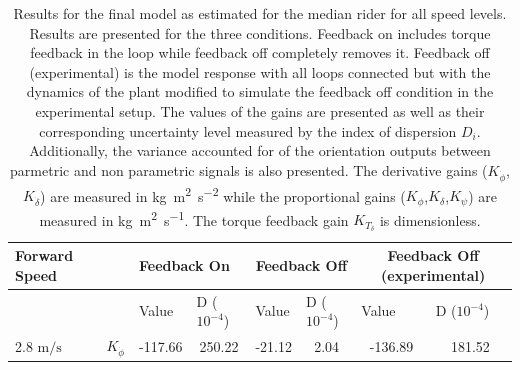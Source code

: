 \begin{table}[]
    \caption{ Results for the final  model as estimated for the median rider for all speed levels. Results are presented for the three conditions. Feedback on includes torque feedback in the loop while feedback off completely removes it. Feedback off (experimental) is the model response with all loops connected but with the dynamics of the plant modified to simulate the feedback off condition in the experimental setup. The values of the gains are presented as well as their corresponding uncertainty level measured by the index of dispersion \ensuremath{D_i}. Additionally, the variance accounted for of the orientation outputs between parmetric and non parametric signals is also presented. The derivative gains (\ensuremath{K_{\dot{\phi}}},\ensuremath{K_{\dot{\delta}}}) are measured in \si{\kilogram\square\meter\per\square\second} while the proportional gains (\ensuremath{K_{\phi}},\ensuremath{K_{\delta}},\ensuremath{K_{\psi}}) are measured in \si{\kilogram\square\meter\per\second}. The torque feedback gain \ensuremath{K_{T_\delta}} is dimensionless.}
    \begin{tabular}{llcccccc}
    \hline
    Forward Speed                &                       & \multicolumn{2}{l}{Feedback On}                                                                 & \multicolumn{2}{c}{Feedback Off}                                                                & \multicolumn{2}{c}{Feedback Off (experimental)}                                                 \\ \hline
                                    &                       & \multicolumn{1}{l}{\multirow{2}{*}{Value}} & \multicolumn{1}{l}{\multirow{2}{*}{D ($10^{-4}$)}} & \multicolumn{1}{l}{\multirow{2}{*}{Value}} & \multicolumn{1}{l}{\multirow{2}{*}{D ($10^{-4}$)}} & \multicolumn{1}{l}{\multirow{2}{*}{Value}} & \multicolumn{1}{l}{\multirow{2}{*}{D ($10^{-4}$)}} \\
                                    &                       & \multicolumn{1}{l}{}                       & \multicolumn{1}{l}{}                               & \multicolumn{1}{l}{}                       & \multicolumn{1}{l}{}                               & \multicolumn{1}{l}{}                       & \multicolumn{1}{l}{}                               \\ \cline{3-8} 
    2.8 $\si{\meter\per\second}$ & $K_{\dot{\phi}} $     & -117.66                                    & 250.22                                             & -21.12                                     & 2.04                                               & -136.89                                    & 181.52                                             \\

\end{tabular}
\end{table}
